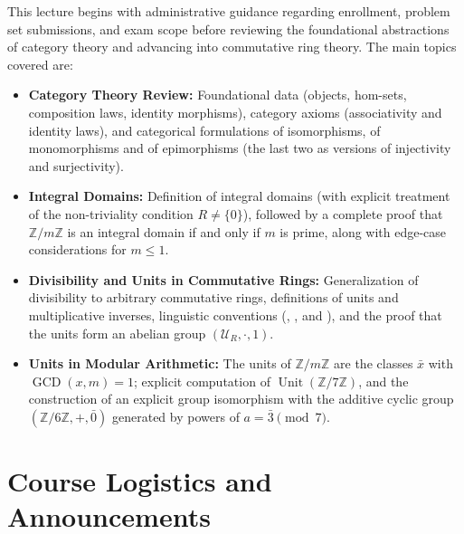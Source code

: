 \begin{overview}
This lecture begins with administrative guidance regarding enrollment, problem set submissions, and exam scope before reviewing the foundational abstractions of category theory and advancing into commutative ring theory. The main topics covered are:
\begin{itemize}
    \item \textbf{Category Theory Review:} Foundational data (objects, hom-sets, composition laws, identity morphisms), category axioms (associativity and identity laws), and categorical formulations of isomorphisms, of monomorphisms and of epimorphisms (the last two as versions of injectivity and surjectivity).
    \item \textbf{Integral Domains:} Definition of integral domains (with explicit treatment of the non-triviality condition $R \neq \{0\}$), followed by a complete proof that $\mathbb{Z}/m\mathbb{Z}$ is an integral domain if and only if $m$ is prime, along with edge-case considerations for $m \le 1$.
    \item \textbf{Divisibility and Units in Commutative Rings:} Generalization of divisibility to arbitrary commutative rings, definitions of units and multiplicative inverses, linguistic conventions (, , and ), and the proof that the units form an abelian group $(\mathcal{U}_R, \cdot, 1)$.
    \item \textbf{Units in Modular Arithmetic:} The units of $\mathbb{Z}/m\mathbb{Z}$ are the classes $\bar{x}$ with $\operatorname{GCD}(x, m) = 1$; explicit computation of $\operatorname{Unit}(\mathbb{Z}/7\mathbb{Z})$, and the construction of an explicit group isomorphism with the additive cyclic group $(\mathbb{Z}/6\mathbb{Z}, +, \bar{0})$ generated by powers of $a = \bar{3} \pmod 7$.
\end{itemize}
\end{overview}

\section{Course Logistics and Announcements}

